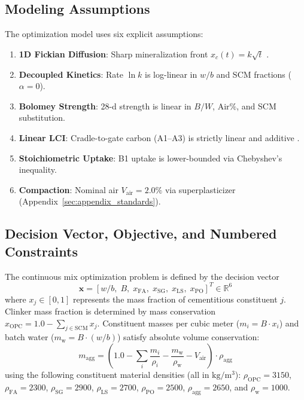 \documentclass[journal]{IEEEtran}
\begin{document}
\subsection{Modeling Assumptions}
The optimization model uses six explicit assumptions:
\begin{enumerate}\setlength{\itemsep}{0.5pt}\setlength{\parskip}{0pt}
    \item[\textbf{A1}] \textbf{1D Fickian Diffusion}: Sharp mineralization front $x_c(t) = k\sqrt{t}$ \cite{papadakis1991}.
    \item[\textbf{A2}] \textbf{Decoupled Kinetics}: Rate $\ln k$ is log-linear in $w/b$ and SCM fractions ($\alpha = 0$).
    \item[\textbf{A3}] \textbf{Bolomey Strength}: 28-d strength is linear in $B/W$, $\mathrm{Air}\%$, and SCM substitution.
    \item[\textbf{A4}] \textbf{Linear LCI}: Cradle-to-gate carbon (A1--A3) is strictly linear and additive \cite{ice3}.
    \item[\textbf{A5}] \textbf{Stoichiometric Uptake}: B1 uptake is lower-bounded via Chebyshev's inequality.
    \item[\textbf{A6}] \textbf{Compaction}: Nominal air $V_{\mathrm{air}} = 2.0\%$ via superplasticizer (Appendix~\ref{sec:appendix_standards}).
\end{enumerate}

\subsection{Decision Vector, Objective, and Numbered Constraints}
The continuous mix optimization problem is defined by the decision vector 
\[
\mathbf{x} = \left[ w/b, \; B, \; x_{\mathrm{FA}}, \; x_{\mathrm{SG}}, \; x_{\mathrm{LS}}, \; x_{\mathrm{PO}} \right]^T \in \mathbb{R}^6
\]
where $x_j \in [0, 1]$ represents the mass fraction of cementitious constituent $j$. Clinker mass fraction is determined by mass conservation $x_{\mathrm{OPC}} = 1.0 - \sum_{j \in \mathrm{SCM}} x_j$. Constituent masses per cubic meter ($m_i = B \cdot x_i$) and batch water ($m_{\mathrm{w}} = B \cdot (w/b)$) satisfy absolute volume conservation:
\begin{equation}
m_{\mathrm{agg}} = \left( 1.0 - \sum_i \frac{m_i}{\rho_i} - \frac{m_{\mathrm{w}}}{\rho_{\mathrm{w}}} - V_{\mathrm{air}} \right) \cdot \rho_{\mathrm{agg}}
\label{eq:agg_balance}
\end{equation}
using the following constituent material densities (all in $\mathrm{kg/m^3}$): $\rho_{\mathrm{OPC}} = 3150$, $\rho_{\mathrm{FA}} = 2300$, $\rho_{\mathrm{SG}} = 2900$, $\rho_{\mathrm{LS}} = 2700$, $\rho_{\mathrm{PO}} = 2500$, $\rho_{\mathrm{agg}} = 2650$, and $\rho_{\mathrm{w}} = 1000$.
\end{document}
